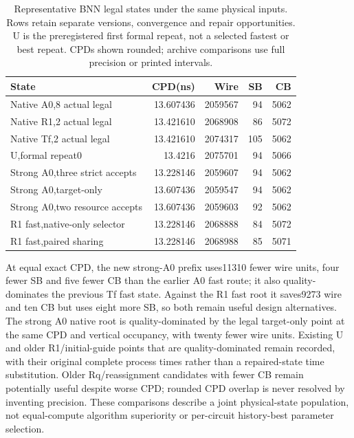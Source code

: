 \begin{table}[t]
\centering\scriptsize
\caption{Representative BNN legal states under the same physical inputs. Rows retain separate versions, convergence and repair opportunities. U is the preregistered first formal repeat, not a selected fastest or best repeat. CPDs shown rounded; archive comparisons use full precision or printed intervals.}
\begin{tabular}{lrrrr}
\hline
State & CPD(ns)&Wire&SB&CB\\
\hline
Native A0,8 actual legal &13.607436&2059567&94&5062\\
Native R1,2 actual legal &13.421610&2068908&86&5072\\
Native Tf,2 actual legal &13.421610&2074317&105&5062\\
U,formal repeat0 &13.4216&2075701&94&5066\\
Strong A0,three strict accepts &13.228146&2059607&94&5062\\
Strong A0,target-only &13.607436&2059547&94&5062\\
Strong A0,two resource accepts &13.607436&2059603&92&5062\\
R1 fast,native-only selector &13.228146&2068888&84&5072\\
R1 fast,paired sharing &13.228146&2068988&85&5071\\
\hline
\end{tabular}
\end{table}
At equal exact CPD, the new strong-A0 prefix uses11310 fewer wire units, four fewer SB and five fewer CB than the earlier A0 fast route; it also quality-dominates the previous Tf fast state. Against the R1 fast root it saves9273 wire and ten CB but uses eight more SB, so both remain useful design alternatives. The strong A0 native root is quality-dominated by the legal target-only point at the same CPD and vertical occupancy, with twenty fewer wire units. Existing U and older R1/initial-guide points that are quality-dominated remain recorded, with their original complete process times rather than a repaired-state time substitution. Older Rq/reassignment candidates with fewer CB remain potentially useful despite worse CPD; rounded CPD overlap is never resolved by inventing precision. These comparisons describe a joint physical-state population, not equal-compute algorithm superiority or per-circuit history-best parameter selection.

